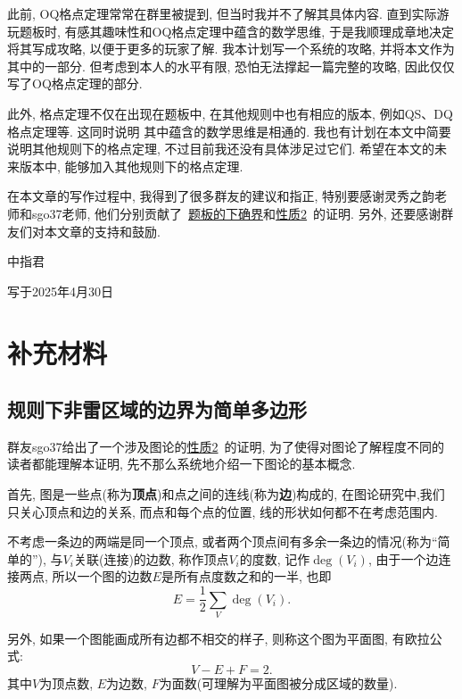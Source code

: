 \documentclass{ctexart}
\newcommand{\varible}[1]{{\Noto[#1]}}
\begin{document}
此前, OQ格点定理常常在群里被提到, 但当时我并不了解其具体内容. 直到实际游玩\varible{O}\varible{Q}题板时, 有感其趣味性和OQ格点定理中蕴含的数学思维, 于是我顺理成章地决定将其写成攻略, 以便于更多的玩家了解. 我本计划写一个系统的\varible{O}\varible{Q}攻略, 并将本文作为其中的一部分. 但考虑到本人的水平有限, 恐怕无法撑起一篇完整的攻略, 因此仅仅写了OQ格点定理的部分.

此外, 格点定理不仅在出现在\varible{O}\varible{Q}题板中, 在其他规则中也有相应的版本, 例如QS、DQ格点定理等. 这同时说明 其中蕴含的数学思维是相通的. 我也有计划在本文中简要说明其他规则下的格点定理, 不过目前我还没有具体涉足过它们. 希望在本文的未来版本中, 能够加入其他规则下的格点定理.

在本文章的写作过程中, 我得到了很多群友的建议和指正, 特别要感谢灵秀之韵老师和sgo37老师, 他们分别贡献了\ \hyperref[inf]{\varible{O}\varible{Q}题板的下确界}和\hyperref[p2]{性质2}\ 的证明. 另外, 还要感谢群友们对本文章的支持和鼓励.

\begin{flushright}
    中指君

    写于2025年4月30日
\end{flushright}
\pagebreak

\appendix

\section{补充材料}
\subsection{\varible{O}\varible{Q}规则下非雷区域的边界为简单多边形}
群友sgo37给出了一个涉及图论的\hyperref[p2]{性质2}\ 的证明, 为了使得对图论了解程度不同的读者都能理解本证明, 先不那么系统地介绍一下图论的基本概念.

首先, 图是一些点(称为\textbf{顶点})和点之间的连线(称为\textbf{边})构成的, 在图论研究中,我们只关心顶点和边的关系, 而点和每个点的位置, 线的形状如何都不在考虑范围内.

不考虑一条边的两端是同一个顶点, 或者两个顶点间有多余一条边的情况(称为``简单的''), 与$V_i$关联(连接)的边数, 称作顶点$V_i$的度数, 记作$\deg(V_i)$, 由于一个边连接两点, 所以一个图的边数$E$是所有点度数之和的一半, 也即
$$
E = \frac{1}{2}\sum_{V}\deg(V_i).
$$

另外, 如果一个图能画成所有边都不相交的样子, 则称这个图为平面图, 有欧拉公式:
$$
V - E + F = 2.
$$
其中$V$为顶点数, $E$为边数, $F$为面数(可理解为平面图被分成区域的数量).
\end{document}
